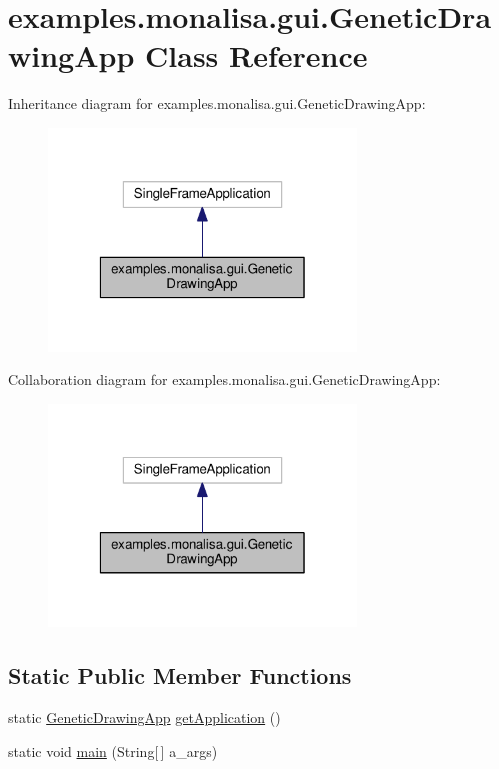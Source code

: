 \hypertarget{classexamples_1_1monalisa_1_1gui_1_1_genetic_drawing_app}{\section{examples.\-monalisa.\-gui.\-Genetic\-Drawing\-App Class Reference}
\label{classexamples_1_1monalisa_1_1gui_1_1_genetic_drawing_app}
}


Inheritance diagram for examples.\-monalisa.\-gui.\-Genetic\-Drawing\-App\-:
\nopagebreak
\begin{figure}[H]
\begin{center}
\leavevmode
\includegraphics[width=232pt]{classexamples_1_1monalisa_1_1gui_1_1_genetic_drawing_app__inherit__graph}
\end{center}
\end{figure}


Collaboration diagram for examples.\-monalisa.\-gui.\-Genetic\-Drawing\-App\-:
\nopagebreak
\begin{figure}[H]
\begin{center}
\leavevmode
\includegraphics[width=232pt]{classexamples_1_1monalisa_1_1gui_1_1_genetic_drawing_app__coll__graph}
\end{center}
\end{figure}
\subsection*{Static Public Member Functions}
\begin{DoxyCompactItemize}
\item 
static \hyperlink{classexamples_1_1monalisa_1_1gui_1_1_genetic_drawing_app}{Genetic\-Drawing\-App} \hyperlink{classexamples_1_1monalisa_1_1gui_1_1_genetic_drawing_app_a1b899b969b78ed62806d90dba15383c7}{get\-Application} ()
\item 
static void \hyperlink{classexamples_1_1monalisa_1_1gui_1_1_genetic_drawing_app_af208bd61c0814c5937419450dc61c5c4}{main} (String\mbox{[}$\,$\mbox{]} a\-\_\-args)
\end{DoxyCompactItemize}
